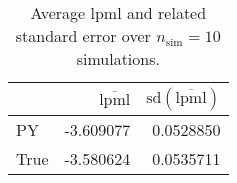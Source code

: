 \begin{table}[H]

\caption{Average lpml and related standard error over $n_{\text{sim}} = 10$ simulations.}
\centering
\begin{tabular}[t]{lrr}
\toprule
  & $\overbar{\text{lpml}}$ & $\text{sd}(\overbar{\text{lpml}})$\\
\midrule
PY & -3.609077 & 0.0528850\\
True & -3.580624 & 0.0535711\\
\bottomrule
\end{tabular}
\end{table}